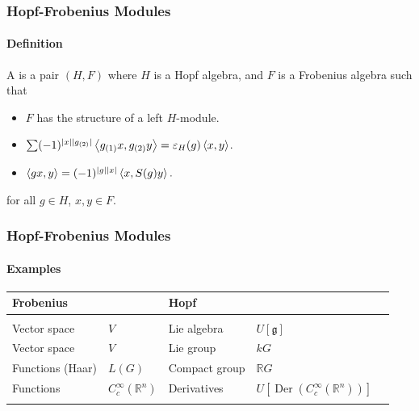 \documentclass{beamer}
\begin{document}


\begin{frame}

\frametitle{Hopf-Frobenius Modules}

\framesubtitle{Definition}

A  is a pair $(H,F)$ where $H$ is a Hopf algebra, and $F$ is a Frobenius algebra such that

\medskip
\begin{itemize}
\item {} $F$ has the structure of a left $H$-module.

\medskip

\item {}   $\sum (-1)^{| x | | g_{(2)} |} \left\langle g_{(1)} x, g_{(2)} y \right\rangle = \varepsilon_H(g) \left\langle x,y \right\rangle$.

\medskip 

\item {}  $\left\langle g x, y \right\rangle = (-1)^{| g | | x |} \left\langle x, S(g) y \right\rangle. $
\end{itemize}

\medskip
for all $g \in H$, $x,y \in F$.



\end{frame}






\begin{frame}

\frametitle{Hopf-Frobenius Modules}

\framesubtitle{Examples}


\begin{tabularx}{\textwidth}{ll|ll>{\raggedright\arraybackslash}X}
\toprule
Frobenius & & Hopf
\\
\midrule
& & \\
Vector space & $V$ & Lie algebra & $U[\mathfrak{g}]$ \\
Vector space & $V$ & Lie group & $k G$ \\
Functions (Haar) & $L(G)$ & Compact group & $\mathbb{R} G$
\\
Functions & $C^{\infty}_c(\mathbb{R}^n)$ & Derivatives & $U \left[ \operatorname{Der}(C^{\infty}_c(\mathbb{R}^n)) \right]$ \\
&& \\
\bottomrule
\end{tabularx}




\end{frame}
\end{document}
